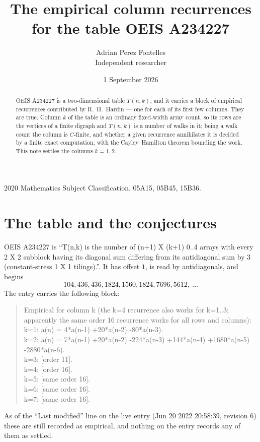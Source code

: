 \documentclass[11pt,a4paper]{article}
\title{The empirical column recurrences for the table OEIS A234227}
\author{Adrian Perez Fontelles\\ \small Independent researcher}
\date{1 September 2026}
\theoremstyle{plain}
\theoremstyle{definition}
\begin{document}
\maketitle

\begin{abstract}
OEIS A234227 is a two-dimensional table $T(n,k)$, and it carries a block of empirical
recurrences contributed by R.~H.~Hardin --- one for each of its first few columns. They are
true. Column $k$ of the table is an ordinary fixed-width array count, so its rows are the
vertices of a finite digraph and $T(n,k)$ is a number of walks in it; being a walk count the
column is $C$-finite, and whether a given recurrence annihilates it is decided by a finite
exact computation, with the Cayley--Hamilton theorem bounding the work. This note settles the columns $k=1, 2$.
\end{abstract}

\noindent\small 2020 Mathematics Subject Classification. 05A15, 05B45, 15B36.\normalsize

\section{The table and the conjectures}

OEIS A234227 is ``T(n,k) is the number of (n+1) X (k+1) 0..4 arrays with every 2 X 2 subblock having its diagonal sum differing from its antidiagonal sum by 3 (constant-stress 1 X 1 tilings).''. It has offset $1$, is
read by antidiagonals, and begins
\[
104, 436, 436, 1824, 1560, 1824, 7696, 5612,\ \dots
\]
The entry carries the following block:
\begin{quote}\small
Empirical for column k (the k=4 recurrence also works for k=1..3; apparently the same order 16 recurrence works for all rows and columns):\\
k=1: a(n) = 4*a(n-1) +20*a(n-2) -80*a(n-3).\\
k=2: a(n) = 7*a(n-1) +20*a(n-2) -224*a(n-3) +144*a(n-4) +1680*a(n-5) -2880*a(n-6).\\
k=3: [order 11].\\
k=4: [order 16].\\
k=5: [same order 16].\\
k=6: [same order 16].\\
k=7: [same order 16].\\
\end{quote}
As of the ``Last modified'' line on the live entry (Jun 20 2022 20:58:39, revision 6) these are still
recorded as empirical, and nothing on the entry records any of them as settled.
\end{document}
